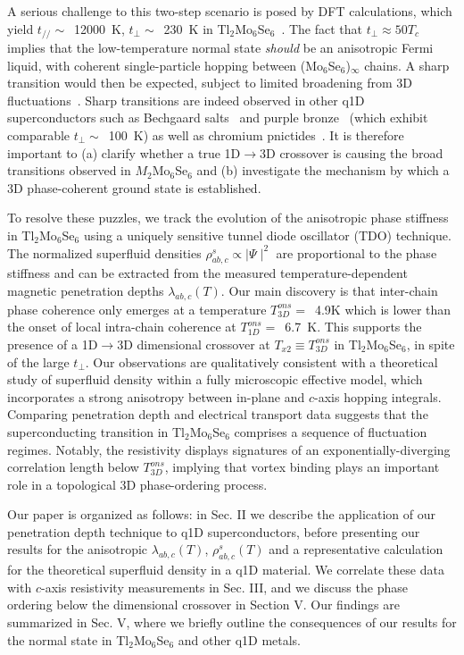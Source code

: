\documentclass[prb,twocolumn,showpacs,preprintnumbers,amsmath,amssymb,floatfix,groupedaddress,superscriptaddress,aps,10pt]{revtex4-1}
\newcommand{\Tl}{Tl$_2$Mo$_6$Se$_6$}
\newcommand{\MMoSe}{$M_2$Mo$_6$Se$_6$}
\begin{document}
A serious challenge to this two-step scenario is posed by DFT calculations, which yield $t_{/\!/}\sim$~12000~K, $t_\perp\sim$~230~K in {\Tl}~\cite{Petrovic2010,Ansermet2016}.  The fact that $t_\perp\approx50T_c$ implies that the low-temperature normal state \emph{should} be an anisotropic Fermi liquid, with coherent single-particle hopping between (Mo$_6$Se$_6$)$_\infty$ chains.  A sharp transition would then be expected, subject to limited broadening from 3D fluctuations~\cite{Larkin2008}. Sharp transitions are indeed observed in other q1D superconductors such as Bechgaard salts~\cite{Jerome2015} and purple bronze~\cite{Greenblatt1984} (which exhibit comparable $t_\perp\sim$~100~K) as well as chromium pnictides~\cite{Bao2015}.  It is therefore important to (a) clarify whether a true 1D$\rightarrow$3D crossover is causing the broad transitions observed in {\MMoSe} and (b) investigate the mechanism by which a 3D phase-coherent ground state is established. 

To resolve these puzzles, we track the evolution of the anisotropic phase stiffness in {\Tl} using a uniquely sensitive tunnel diode oscillator (TDO) technique.  The normalized superfluid densities $\rho^s_{ab,c}\propto\mid$$\Psi$$\mid^{2}$ are proportional to the phase stiffness and can be extracted from the measured temperature-dependent magnetic penetration depths $\lambda_{ab,c}(T)$.  Our main discovery is that inter-chain phase coherence only emerges at a temperature $T_{3D}^{ons}=$~4.9K which is lower than the onset of local intra-chain coherence at $T_{1D}^{ons}=$~6.7~K.  This supports the presence of a 1D$\rightarrow$3D dimensional crossover at $T_{x2} \equiv T_{3D}^{ons}$ in {\Tl}, in spite of the large $t_\perp$. Our observations are qualitatively consistent with a theoretical study of superfluid density within a fully microscopic effective model, which incorporates a strong anisotropy between in-plane and $c$-axis hopping integrals. Comparing penetration depth and electrical transport data suggests that the superconducting transition in {\Tl} comprises a sequence of fluctuation regimes.  Notably, the resistivity displays signatures of an exponentially-diverging correlation length below $T_{3D}^{ons}$, implying that vortex binding plays an important role in a topological 3D phase-ordering process.  

Our paper is organized as follows: in Sec. II we describe the application of our penetration depth technique to q1D superconductors, before presenting our results for the anisotropic $\lambda_{ab,c}(T)$, $\rho^s_{ab,c}(T)$ and a representative calculation for the theoretical superfluid density in a q1D material. We correlate these data with $c$-axis resistivity measurements in Sec. III, and we discuss the phase ordering below the dimensional crossover in Section V.  Our findings are summarized in Sec. V, where we briefly outline the consequences of our results for the normal state in {\Tl} and other q1D metals.
\end{document}
